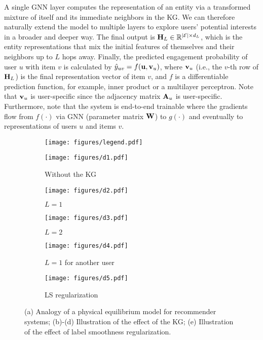 \documentclass[sigconf]{acmart}
\begin{document}
		A single GNN layer computes the representation of an entity via a transformed mixture of itself and its immediate neighbors in the KG.
		We can therefore naturally extend the model to multiple layers to explore users' potential interests in a broader and deeper way.
		The final output is ${\bf H}_L \in \mathbb R^{|\mathcal E| \times d_L}$, which is the entity representations that mix the initial features of themselves and their neighbors up to $L$ hops away.
		Finally, the predicted engagement probability of user $u$ with item $v$ is calculated by $\hat y_{uv} = f({\bf u}, {\bf v}_u)$, where ${\bf v}_u$ (i.e., the $v$-th row of ${\bf H}_L$) is the final representation vector of item $v$, and $f$ is a differentiable prediction function, for example, inner product or a multilayer perceptron.
		Note that ${\bf v}_u$ is user-specific since the adjacency matrix ${\bf A}_u$ is user-specific.
		Furthermore, note that the system is end-to-end trainable where the gradients flow from $f(\cdot)$ via GNN (parameter matrix $\bf W$) to $g(\cdot)$ and eventually to representations of users $u$ and items $v$.
	
	
	\begin{figure*}
			\centering
			\begin{subfigure}[b]{0.9\textwidth}
   				\texttt{[image: figures/legend.pdf]}
			\end{subfigure}
			\hfill
			\begin{subfigure}[b]{0.19\textwidth}
   				\texttt{[image: figures/d1.pdf]}
   				\caption{Without the KG}
   				\label{fig:d1}
			\end{subfigure}
			\hfill
			\begin{subfigure}[b]{0.19\textwidth}
				\texttt{[image: figures/d2.pdf]}
				\caption{$L = 1$}
				\label{fig:d2}
			\end{subfigure}
			\hfill
			\begin{subfigure}[b]{0.19\textwidth}
   				\texttt{[image: figures/d3.pdf]}
   				\caption{$L = 2$}
   				\label{fig:d3}
			\end{subfigure}
			\hfill
			\begin{subfigure}[b]{0.19\textwidth}
				\texttt{[image: figures/d4.pdf]}
				\caption{$L = 1$ for another user}
				\label{fig:d4}
			\end{subfigure}
			\hfill
			\begin{subfigure}[b]{0.19\textwidth}
				\texttt{[image: figures/d5.pdf]}
				\caption{LS regularization}
				\label{fig:d5}
			\end{subfigure}
			\caption{(a) Analogy of a physical equilibrium model for recommender systems; (b)-(d) Illustration of the effect of the KG; (e) Illustration of the effect of label smoothness regularization.}
			\label{fig:discussion}
		\end{figure*}
		
\end{document}
